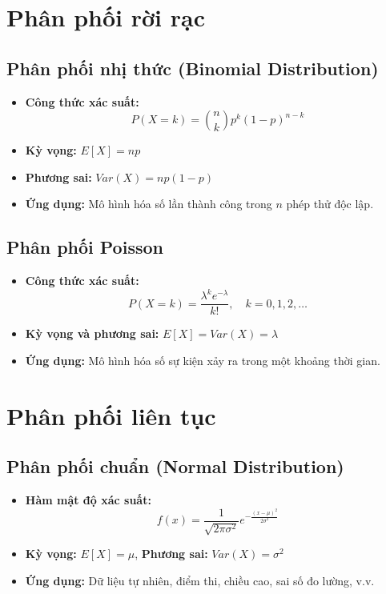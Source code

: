 \section{Phân phối rời rạc}

\subsection{Phân phối nhị thức (Binomial Distribution)}
\begin{itemize}
    \item \textbf{Công thức xác suất:}
    \[
        P(X = k) = \binom{n}{k}p^k(1-p)^{n-k}
    \]
    \item \textbf{Kỳ vọng:} $E[X] = np$
    \item \textbf{Phương sai:} $Var(X) = np(1-p)$
    \item \textbf{Ứng dụng:} Mô hình hóa số lần thành công trong $n$ phép thử độc lập.
\end{itemize}

\subsection{Phân phối Poisson}
\begin{itemize}
    \item \textbf{Công thức xác suất:}
    \[
        P(X = k) = \frac{\lambda^k e^{-\lambda}}{k!}, \quad k = 0, 1, 2, \dots
    \]
    \item \textbf{Kỳ vọng và phương sai:} $E[X] = Var(X) = \lambda$
    \item \textbf{Ứng dụng:} Mô hình hóa số sự kiện xảy ra trong một khoảng thời gian.
\end{itemize}

\section{Phân phối liên tục}

\subsection{Phân phối chuẩn (Normal Distribution)}
\begin{itemize}
    \item \textbf{Hàm mật độ xác suất:}
    \[
        f(x) = \frac{1}{\sqrt{2\pi\sigma^2}} e^{-\frac{(x-\mu)^2}{2\sigma^2}}
    \]
    \item \textbf{Kỳ vọng:} $E[X] = \mu$, \textbf{Phương sai:} $Var(X) = \sigma^2$
    \item \textbf{Ứng dụng:} Dữ liệu tự nhiên, điểm thi, chiều cao, sai số đo lường, v.v.
\end{itemize}

